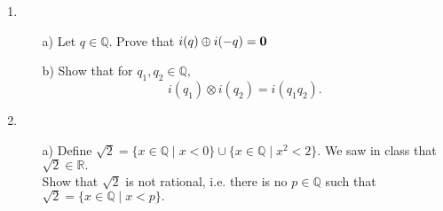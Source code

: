 \documentclass[openany, amssymb, psamsfonts]{amsart}
\newcommand{\bbQ}{\mathbb{Q}}
\newcommand{\bbR}{\mathbb{R}}
\theoremstyle{definition}
\numberwithin{equation}{section}
\begin{document}
\begin{enumerate}

\item
\begin{enumerate}
\item[a)] Let $q\in\bbQ.$
Prove that  $i(q) \oplus i(-q)=\bf{0}$ 
\item[b)] Show that for $q_1,q_2\in \bbQ, $
 $$i(q_1)\otimes i(q_2)=i(q_1 q_2).$$

 \end{enumerate}







\item 
\begin{enumerate}
\item[a)] Define $\sqrt{2}=\{x\in\bbQ\mid x< 0\}\cup\{x\in \bbQ\mid x^2<2\}.$ We saw in class that $\sqrt{2}\in\bbR.$\\Show that
$\sqrt{2}$ is not rational, i.e. there is no $p\in\bbQ$ such that $\sqrt{2}=\{x\in\bbQ\mid x<p\}.$


\end{enumerate}
\end{enumerate}
\end{document}
